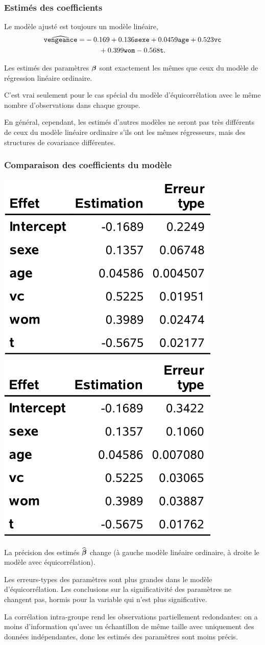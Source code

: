\documentclass{beamer}
\begin{document}
\begin{frame}[fragile]
\frametitle{Estimés des coefficients}
\bi
\item Le modèle ajusté est toujours un modèle linéaire, 
\begin{align*}
\widehat{\texttt{vengeance}}=&-0.169 + 0.136 \texttt{sexe} + 0.0459 \texttt{age} + 0.523 \texttt{vc}\\
 & \qquad + 0.399 \texttt{wom} -0.568 \texttt{t}.
\end{align*}
\item  Les estimés des paramètres $\boldsymbol {\beta}$ sont exactement les mêmes que ceux du modèle de régression linéaire ordinaire.
\item C'est vrai seulement pour le cas spécial  du modèle d'équicorrélation avec le même nombre d'observations dans chaque groupe.
\item En général, cependant, les estimés d'autres modèles ne seront pas très différents de ceux du modèle linéaire ordinaire s'ils ont les mêmes régresseurs, mais des structures de covariance différentes.
\ei
\end{frame}




\begin{frame}[fragile]
\frametitle{Comparaison des coefficients du modèle}

\begin{center}
\includegraphics[width = 0.35\linewidth]{img/c5/diapos6-e13}
\includegraphics[width = 0.35\linewidth]{img/c5/diapos6-e14}
\end{center}
{\small
\bi
\item La précision des estimés $\widehat{\boldsymbol {\beta}}$ change (à gauche modèle linéaire ordinaire, à droite le modèle avec équicorrélation).
\item Les erreurs-types des paramètres sont plus grandes dans le modèle d'équicorrélation. Les conclusions sur la significativité des paramètres ne changent pas, hormis pour la variable  qui n'est plus significative.
\item La corrélation intra-groupe rend les observations partiellement redondantes: on a moins d'information qu'avec un échantillon de même taille avec uniquement des données indépendantes, donc les estimés des paramètres sont moins précis.
\ei
}
\end{frame}
\end{document}
